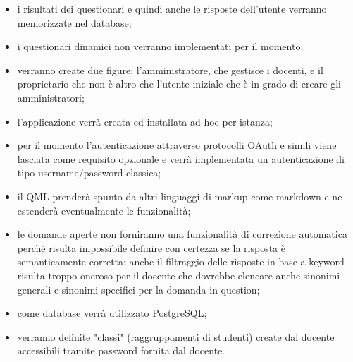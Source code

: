 \documentclass[12pt,a4paper]{article}
\begin{document}
\begin{itemize}
    \item i risultati dei questionari e quindi anche le risposte dell'utente verranno memorizzate nel
        database;
    \item i questionari dinamici non verranno implementati per il momento;
    \item verranno create due figure: l'amministratore, che gestisce i docenti, e il proprietario
        che non è altro che l'utente iniziale che è in grado di creare gli amministratori;
    \item l'applicazione verrà creata ed installata ad hoc per istanza;
    \item per il momento l'autenticazione attraverso protocolli OAuth e simili viene lasciata
        come requisito opzionale e verrà implementata un autenticazione di tipo username/password
        classica;
    \item il QML prenderà spunto da altri linguaggi di markup come markdown e ne estenderà
        eventualmente le funzionalità;
    \item le domande aperte non forniranno una funzionalità di correzione automatica perché
        risulta impossibile definire con certezza se la risposta è semanticamente corretta;
        anche il filtraggio delle risposte in base a keyword risulta troppo oneroso per
        il docente che dovrebbe elencare anche sinonimi generali e sinonimi specifici per la
        domanda in question;
    \item come database verrà utilizzato PostgreSQL;
    \item verranno definite "classi" (raggruppamenti di studenti) create dal docente         accessibili tramite password fornita dal docente.
\end{itemize}
\end{document}
